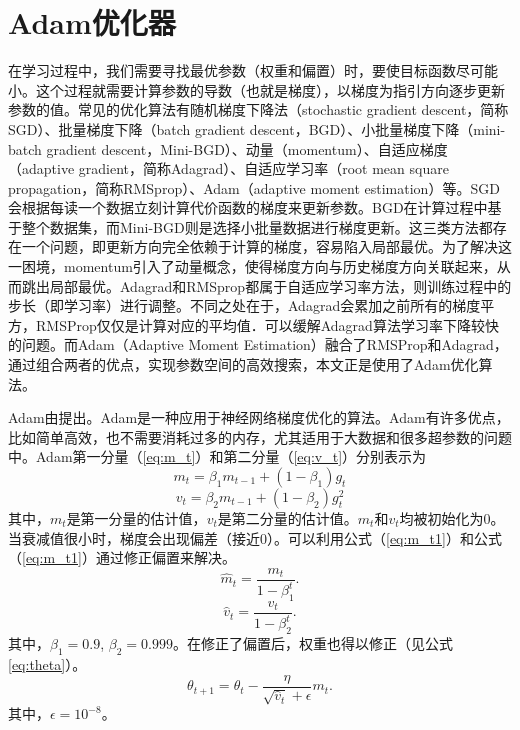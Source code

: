 \section{Adam优化器}
在学习过程中，我们需要寻找最优参数（权重和偏置）时，要使目标函数尽可能小。这个过程就需要计算参数的导数（也就是梯度），以梯度为指引方向逐步更新参数的值。常见的优化算法有随机梯度下降法（stochastic gradient descent，简称SGD）、批量梯度下降（batch gradient descent，BGD）、小批量梯度下降（mini-batch gradient descent，Mini-BGD）、动量（momentum）、自适应梯度（adaptive gradient，简称Adagrad）、自适应学习率（root mean square propagation，简称RMSprop）、Adam（adaptive moment estimation）等。SGD会根据每读一个数据立刻计算代价函数的梯度来更新参数。BGD在计算过程中基于整个数据集，而Mini-BGD则是选择小批量数据进行梯度更新。这三类方法都存在一个问题，即更新方向完全依赖于计算的梯度，容易陷入局部最优。为了解决这一困境，momentum引入了动量概念，使得梯度方向与历史梯度方向关联起来，从而跳出局部最优。Adagrad和RMSprop都属于自适应学习率方法，则训练过程中的步长（即学习率）进行调整。不同之处在于，Adagrad会累加之前所有的梯度平方，RMSProp仅仅是计算对应的平均值．可以缓解Adagrad算法学习率下降较快的问题。而Adam（Adaptive Moment Estimation）融合了RMSProp和Adagrad，通过组合两者的优点，实现参数空间的高效搜索，本文正是使用了Adam优化算法。

Adam由\citet{kingma2014adam}提出。Adam是一种应用于神经网络梯度优化的算法。Adam有许多优点，比如简单高效，也不需要消耗过多的内存，尤其适用于大数据和很多超参数的问题中。Adam第一分量（\ref{eq:m_t}）和第二分量（\ref{eq:v_t}）分别表示为
\begin{equation} \label{eq:m_t}
    m_t = \beta_1 m_{t-1}+(1-\beta_1)g_t
\end{equation}
\begin{equation} \label{eq:v_t}
    v_t = \beta_2 m_{t-1}+(1-\beta_2)g^2_t
\end{equation}
其中，$m_t$是第一分量的估计值，$v_t$是第二分量的估计值。$m_t$和$v_t$均被初始化为0。当衰减值很小时，梯度会出现偏差（接近0）。可以利用公式（\ref{eq:m_t1}）和公式（\ref{eq:m_t1}）通过修正偏置来解决。
\begin{equation} \label{eq:m_t1}
    \hat{m}_t = \frac{m_t}{1-\beta_1^t}.
\end{equation}
\begin{equation} \label{eq:v_t1}
    \hat{v}_t = \frac{v_t}{1-\beta_2^t}.
\end{equation}
其中，$\beta_1=0.9$, $\beta_2=0.999$。在修正了偏置后，权重也得以修正（见公式\ref{eq:theta}）。
\begin{equation} \label{eq:theta}
    \theta_{t+1}=\theta_t-\frac{\eta}{\sqrt{\hat{v}_t}+\epsilon}m_t.
\end{equation}
其中，$\epsilon=10^{-8}$。

